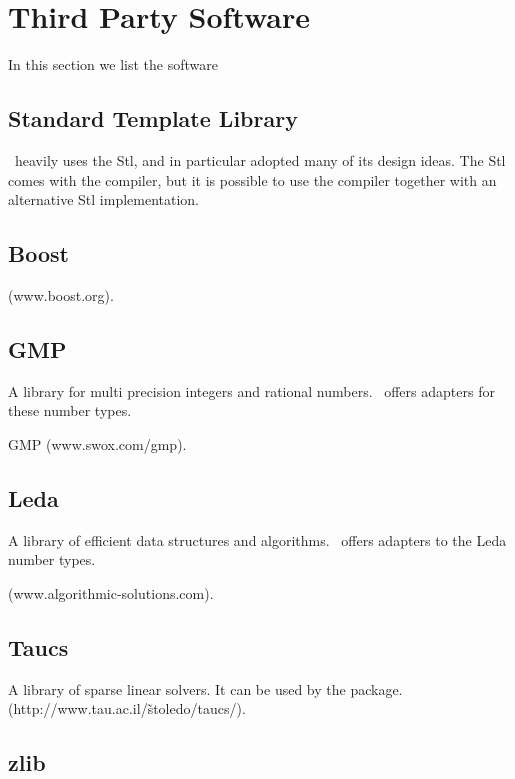\section{Third Party Software}

In this section we list the software 


\subsection{Standard Template Library \label{thirdparty:stl}}

\cgal\ heavily uses the {\sc Stl}, and in particular adopted
many of its design ideas.   The {\sc Stl} comes with the compiler,
but it is possible to use the compiler together with an 
alternative {\sc Stl} implementation.


\subsection{Boost \label{thirdparty:boost}}

 (www.boost.org).


\subsection{GMP \label{thirdparty:gmp}}

A library for multi precision integers and rational numbers.
\cgal\ offers adapters for these number types.

GMP (www.swox.com/gmp).



\subsection{Leda \label{thirdparty:leda}}

A library of efficient data structures and algorithms. \cgal\ offers
adapters to the {\sc Leda} number types.

 (www.algorithmic-solutions.com).


\subsection{Taucs \label{thirdparty:taucs}}

A library of sparse linear solvers.
It can be used by the  package.
 (http://www.tau.ac.il/\~stoledo/taucs/).

\subsection{zlib \label{thirdparty:zlib}}

